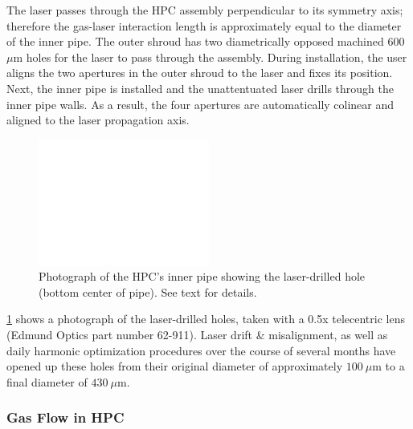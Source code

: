 The laser passes through the HPC assembly perpendicular to its symmetry axis; therefore the gas-laser interaction length is approximately equal to the diameter of the inner pipe. The outer shroud has two diametrically opposed machined 600 $\mu$m holes for the laser to pass through the assembly. During installation, the user aligns the two apertures in the outer shroud to the laser and fixes its position. Next, the inner pipe is installed and the unattentuated laser drills through the inner pipe walls. As a result, the four apertures are automatically colinear and aligned to the laser propagation axis.

\begin{figure}
	\centering
	\includegraphics[width=0.5\textwidth]{figures/chap3/HPC_laserhole_500x370.png}
	\caption{Photograph of the HPC's inner pipe showing the laser-drilled hole (bottom center of pipe). See text for details.}
	\label{fig:HPC_laserhole}
\end{figure}

\cref{fig:HPC_laserhole} shows a photograph of the laser-drilled holes, taken with a 0.5x telecentric lens (Edmund Optics part number 62-911). Laser drift \&  misalignment, as well as daily harmonic optimization procedures over the course of several months have opened up these holes from their original diameter of approximately $100 \ \mu \textrm{m}$ to a final diameter of $430 \ \mu \textrm{m}$.

\subsubsection{Gas Flow in HPC}

